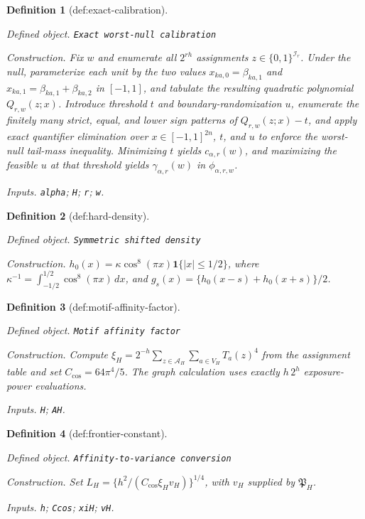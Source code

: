 \documentclass{article}
\newtheorem{definition}{Definition}
\begin{document}
\begin{definition}[def:exact-calibration]\label{def:exact-calibration}
\par\smallskip\noindent\emph{Defined object.} \texttt{Exact worst-\allowbreak{}null calibration}
\par\smallskip\noindent\emph{Construction.} Fix \(w\) and enumerate all \(2^{rh}\) assignments \(z\in\{0,1\}^{\mathcal I_r}\). Under the null, parameterize each unit by the two values \(x_{ka,0}=\beta_{ka,1}\) and \(x_{ka,1}=\beta_{ka,1}+\beta_{ka,2}\) in \([-1,1]\), and tabulate the resulting quadratic polynomial \(Q_{r,w}(z;x)\). Introduce threshold \(t\) and boundary-randomization \(u\), enumerate the finitely many strict, equal, and lower sign patterns of \(Q_{r,w}(z;x)-t\), and apply exact quantifier elimination over \(x\in[-1,1]^{2n}\), \(t\), and \(u\) to enforce the worst-null tail-mass inequality. Minimizing \(t\) yields \(c_{\alpha,r}(w)\), and maximizing the feasible \(u\) at that threshold yields \(\gamma_{\alpha,r}(w)\) in \(\phi_{\alpha,r,w}\).
\par\smallskip\noindent\emph{Inputs.} \texttt{alpha}; \texttt{H}; \texttt{r}; \texttt{w}.
\end{definition}

\begin{definition}[def:hard-density]\label{def:hard-density}
\par\smallskip\noindent\emph{Defined object.} \texttt{Symmetric shifted density}
\par\smallskip\noindent\emph{Construction.} \(h_0(x)=\kappa\cos^8(\pi x)\mathbf1\{|x|\le1/2\}\), where \(\kappa^{-1}=\int_{-1/2}^{1/2}\cos^8(\pi x)\,dx\), and \(g_s(x)=\{h_0(x-s)+h_0(x+s)\}/2\).
\end{definition}

\begin{definition}[def:motif-affinity-factor]\label{def:motif-affinity-factor}
\par\smallskip\noindent\emph{Defined object.} \texttt{Motif affinity factor}
\par\smallskip\noindent\emph{Construction.} Compute \(\xi_H=2^{-h}\sum_{z\in\mathcal A_H}\sum_{a\in V_H}T_a(z)^4\) from the assignment table and set \(C_{\cos}=64\pi^4/5\). The graph calculation uses exactly \(h\,2^h\) exposure-power evaluations.
\par\smallskip\noindent\emph{Inputs.} \texttt{H}; \texttt{AH}.
\end{definition}

\begin{definition}[def:frontier-constant]\label{def:frontier-constant}
\par\smallskip\noindent\emph{Defined object.} \texttt{Affinity-\allowbreak{}to-\allowbreak{}variance conversion}
\par\smallskip\noindent\emph{Construction.} Set \(L_H=\{h^2/(C_{\cos}\xi_Hv_H)\}^{1/4}\), with \(v_H\) supplied by \(\mathfrak P_H\).
\par\smallskip\noindent\emph{Inputs.} \texttt{h}; \texttt{Ccos}; \texttt{xiH}; \texttt{vH}.
\end{definition}
\end{document}
